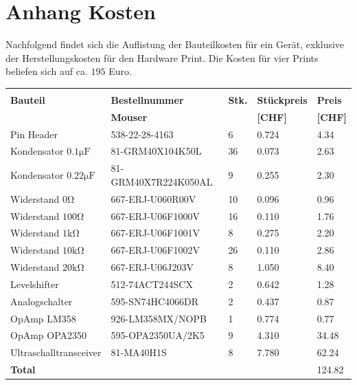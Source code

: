 \clearpage
\section{Anhang Kosten}\label{sec:appendix_kosten}

Nachfolgend findet sich die Auflistung der Bauteilkosten für ein Gerät, exklusive der Herstellungskosten für den Hardware Print. Die Kosten für vier Prints beliefen sich auf ca. $195$ Euro.\\


\begin{table}[h]
\begin{center}
\begin{tabular}{p{}p{}p{}p{}p{}}
\hline
					&				&				&				\\[-3mm]
\textbf{Bauteil}			&\textbf{Bestellnummer}		&\textbf{Stk.}			&\textbf{Stückpreis} 		&\textbf{Preis}	\\[1mm]
					&\textbf{Mouser}		&				&\textbf{[CHF]} 		&\textbf{[CHF]}	\\[1mm]
\hline
Pin Header				&538-22-28-4163			&6				&0.724				&4.34			\\[1mm]
Kondensator $0.1 \mathrm{\mu F}$	&81-GRM40X104K50L		&36				&0.073				&2.63			\\[1mm]
Kondensator $0.22 \mathrm{\mu F}$	&81-GRM40X7R224K050AL		&9				&0.255				&2.30			\\[1mm]
Widerstand $0 \mathrm{\Omega}$		&667-ERJ-U060R00V		&10				&0.096				&0.96			\\[1mm]
Widerstand $100 \mathrm{\Omega}$	&667-ERJ-U06F1000V		&16				&0.110				&1.76			\\[1mm]
Widerstand $1 \mathrm{k \Omega}$	&667-ERJ-U06F1001V		&8				&0.275				&2.20			\\[1mm]
Widerstand $10 \mathrm{k \Omega}$	&667-ERJ-U06F1002V		&26				&0.110				&2.86			\\[1mm]
Widerstand $20 \mathrm{k \Omega}$	&667-ERJ-U06J203V		&8				&1.050				&8.40			\\[1mm]
Levelshifter 				&512-74ACT244SCX		&2				&0.642				&1.28			\\[1mm]
Analogschalter				&595-SN74HC4066DR		&2				&0.437				&0.87			\\[1mm]
OpAmp LM358				&926-LM358MX/NOPB		&1				&0.774				&0.77			\\[1mm]
OpAmp OPA2350				&595-OPA2350UA/2K5		&9				&4.310				&34.48			\\[1mm]
Ultraschalltransceiver			&81-MA40H1S			&8				&7.780				&62.24			\\[1mm]
\hline
\textbf{Total}				&				&				&				&124.82			\\[1mm]
\hline
\hline
\end{tabular}
\label{table:kosten}
\end{center}
\end{table}



